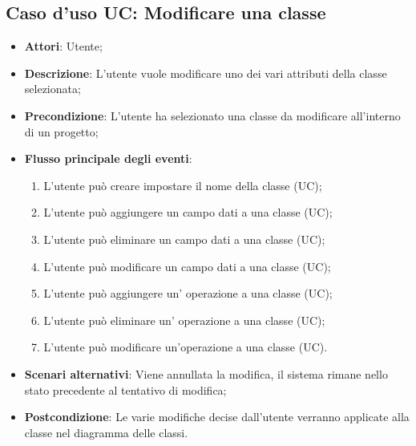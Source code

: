 \documentclass[../AnalisiDeiRequisiti.tex]{subfiles}
\begin{document}
			\subsection{Caso d'uso UC: Modificare una classe}
			\begin{itemize}
				\item \textbf{Attori}: Utente;
				
				\item \textbf{Descrizione}: L'utente vuole modificare uno dei vari attributi della classe selezionata;
				
				\item \textbf{Precondizione}: L'utente ha selezionato una classe da modificare all'interno di un progetto;
				
				\item \textbf{Flusso principale degli eventi}:
				\begin{enumerate}
					\item L'utente può creare impostare il nome della classe (UC);
					\item L'utente può aggiungere un campo dati a una classe (UC);
					\item L'utente può eliminare un campo dati a una classe (UC);
					\item L'utente può modificare un campo dati a una classe (UC);
					\item L'utente può aggiungere un' operazione a una classe (UC);
					\item L'utente può eliminare un' operazione a una classe (UC);
					\item L'utente può modificare un'operazione a una classe (UC).
				\end{enumerate}
				
				\item \textbf{Scenari alternativi}: Viene annullata la modifica, il sistema 
				rimane nello stato precedente al tentativo di modifica;
				
				
				\item \textbf{Postcondizione}: Le varie modifiche decise dall'utente verranno applicate alla classe nel diagramma delle classi.
			\end{itemize}
			
\end{document}
